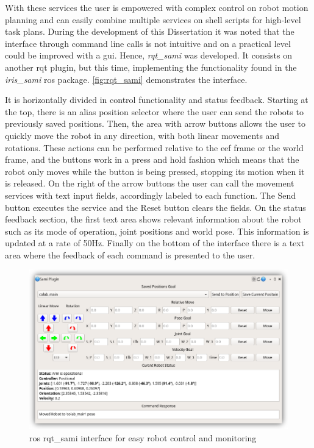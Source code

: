 \par With these services the user is empowered with complex control on robot motion planning and can easily combine multiple services on shell scripts for high-level task plans. During the development of this Dissertation it was noted that the interface through command line calls is not intuitive and on a practical level could be improved with a \ac{gui}. Hence, \textit{rqt\_sami} was developed. It consists on another rqt plugin, but this time, implementing the functionality found in the \textit{iris\_sami} \ac{ros} package. \autoref{fig:rqt_sami} demonstrates the interface. 
\par It is horizontally divided in control functionality and status feedback. Starting at the top, there is an alias position selector where the user can send the robots to previously saved positions. Then, the area with arrow buttons allows the user to quickly move the robot in any direction, with both linear movements and rotations. These actions can be performed relative to the \ac{eef} frame or the world frame, and the buttons work in a press and hold fashion which means that the robot only moves while the button is being pressed, stopping its motion when it is released. On the right of the arrow buttons the user can call the movement services with text input fields, accordingly labeled to each function. The Send button executes the service and the Reset button clears the fields. On the status feedback section, the first text area shows relevant information about the robot such as its mode of operation, joint positions and world pose. This information is updated at a rate of 50Hz. Finally on the bottom of the interface there is a text area where the feedback of each command is presented to the user.

\begin{figure}[h]
    \centering
    \includegraphics[width=0.9\linewidth]{figs/chp5/rqt_sami.png}
    \caption{\ac{ros} rqt\_sami interface for easy robot control and monitoring}
    \label{fig:rqt_sami}
\end{figure}

